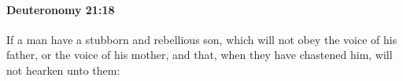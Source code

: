 
		\paragraph{Deuteronomy 21:18} %
			\label{DEUTERONOMY-21-18}

			If a man have a stubborn and rebellious son, which will not obey the voice of his father, or the voice of his mother, and that, when they have chastened him, will not hearken unto them:



